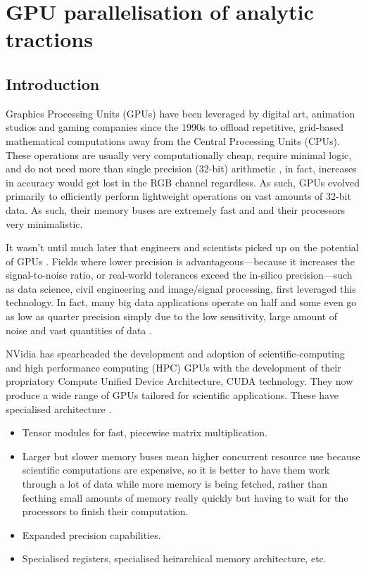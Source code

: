 \section{GPU parallelisation of analytic tractions}\label{s:parallel}

\subsection{Introduction}
Graphics Processing Units (GPUs) have been leveraged by digital art, animation studios and gaming companies since the 1990s to offload repetitive, grid-based mathematical computations away from the Central Processing Units (CPUs). These operations are usually very computationally cheap, require minimal logic, and do not need more than single precision (32-bit) arithmetic \cite{gpu1,gpu2,gpu3}, in fact, increases in accuracy would get lost in the RGB channel regardless. As such, GPUs evolved primarily to efficiently perform lightweight operations on vast amounts of 32-bit data. As such, their memory buses are extremely fast and and their processors very minimalistic.

It wasn't until much later that engineers and scientists picked up on the potential of GPUs \cite{gpu_comp,mixedPrecFEM,jia2014gpu}. Fields where lower precision is advantageous---because it increases the signal-to-noise ratio, or real-world tolerances exceed the in-silico precision---such as data science, civil engineering and image/signal processing, first leveraged this technology. In fact, many big data applications operate on half and some even go as low as quarter precision simply due to the low sensitivity, large amount of noise and vast quantities of data \cite{pagerank}.

NVidia has spearheaded the development and adoption of scientific-computing and high performance computing (HPC) GPUs with the development of their propriatory Compute Unified Device Architecture, CUDA technology. They now produce a wide range of GPUs tailored for scientific applications. These have specialised architecture \cite{nvidia}.
\begin{itemize}
    \item Tensor modules for fast, piecewise matrix multiplication.
    \item Larger but slower memory buses mean higher concurrent resource use because scientific computations are expensive, so it is better to have them work through a lot of data while more memory is being fetched, rather than fecthing small amounts of memory really quickly but having to wait for the processors to finish their computation.
    \item Expanded precision capabilities.
    \item Specialised registers, specialised heirarchical memory architecture, etc.
\end{itemize}

